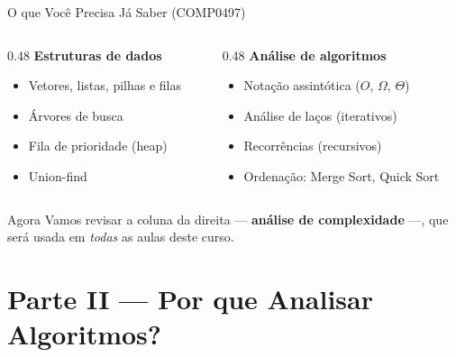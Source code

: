 \documentclass[aspectratio=169]{beamer}
\begin{document}
\begin{frame}{O que Você Precisa Já Saber (COMP0497)}
  \begin{columns}[T]
    \begin{column}{0.48\textwidth}
      \textbf{Estruturas de dados}
      \begin{itemize}
        \item Vetores, listas, pilhas e filas
        \item Árvores de busca
        \item Fila de prioridade (heap)
        \item Union-find
      \end{itemize}
    \end{column}
    \begin{column}{0.48\textwidth}
      \textbf{Análise de algoritmos}
      \begin{itemize}
        \item Notação assintótica ($O$, $\Omega$, $\Theta$)
        \item Análise de laços (iterativos)
        \item Recorrências (recursivos)
        \item Ordenação: Merge Sort, Quick Sort
      \end{itemize}
    \end{column}
  \end{columns}

  \vspace{0.4cm}
  \begin{block}{Agora}
    Vamos revisar a coluna da direita --- \textbf{análise de complexidade} ---, que
    será usada em \emph{todas} as aulas deste curso.
  \end{block}
\end{frame}

\section{Parte II --- Por que Analisar Algoritmos?}
\end{document}
